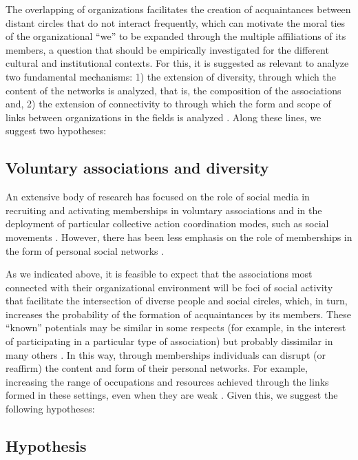 The overlapping of organizations facilitates the creation of acquaintances between distant circles that do not interact frequently, which can motivate the moral ties of the organizational “we” to be expanded through the multiple affiliations of its members, a question that should be empirically investigated for the different cultural and institutional contexts. For this, it is suggested as relevant to analyze two fundamental mechanisms: 1) the extension of diversity, through which the content of the networks is analyzed, that is, the composition of the associations and, 2) the extension of connectivity to through which the form and scope of links between organizations in the fields is analyzed \parencite{paxton_trust_2018}. Along these lines, we suggest two hypotheses:
\bigskip


\subsection{Voluntary associations and diversity}

An extensive body of research has focused on the role of social media in recruiting and activating memberships in voluntary associations and in the deployment of particular collective action coordination modes, such as social movements \parencite{gould_collective_1993,mcpherson_social_1992,tilly_mobilization_1978}. However, there has been less emphasis on the role of memberships in the form of personal social networks \parencite{benton_uniters_2016,tindall_network_2012}.
\bigskip

As we indicated above, it is feasible to expect that the associations most connected with their organizational environment will be foci of social activity that facilitate the intersection of diverse people and social circles, which, in turn, increases the probability of the formation of acquaintances by its members. These “known” potentials may be similar in some respects (for example, in the interest of participating in a particular type of association) but probably dissimilar in many others \parencite{erickson_social_2003}. In this way, through memberships individuals can disrupt (or reaffirm) the content and form of their personal networks. For example, increasing the range of occupations and resources achieved through the links formed in these settings, even when they are weak \parencite{benton_uniters_2016,magee_civic_2008,son_social_2008}. Given this, we suggest the following hypotheses:

\subsection{Hypothesis} 

